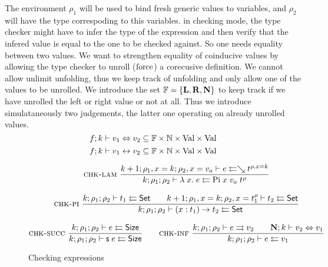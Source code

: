 The environment $\rho_1$ will be used to bind fresh generic values to variables, and $\rho_2$ will have the type correspoding to this variables. in checking mode, the type checker might have to infer the type of the expression and then verify that the infered value is equal to the one to be checked against.
So one needs equality between two values.
We want to strengthen equality of coinducive values by allowing the type checker to unroll ($\mathrm{force}$) a corecusive definition. We cannot allow unlimit unfolding, thus we keep track of unfolding and only allow one of the values to be unrolled.
We introduce the set $ \mathbb{F} = \{\mathbf{L}, \mathbf{R}, \mathbf{N} \} $ to keep track if we have unrolled the left or right value or not at all.
Thus we introduce simulataneously two judgements, the latter one operating on already unrolled values.
\[f;k\vdash v_1\Leftrightarrow v_2 \subseteq \mathbb{F} \times \mathbb{N} \times \mathrm{Val} \times \mathrm{Val} \]
\[f;k\vdash v_1{\;\leftrightarrow\;}v_2 \subseteq \mathbb{F} \times \mathbb{N} \times\mathrm{Val} \times \mathrm{Val} \]

\begin{figure}[p]

\begin{gather*}
\mbox{\sc chk-lam}\ \dfrac{k+1;\rho_1,x=k;\rho_2,x=v_a\vdash e\leftleftarrows\searrow t^{\rho,x=k}}{k;\rho_1;\rho_2\vdash\lambda\; x .\;{e}\leftleftarrows\mathrm{Pi} \; x \; v_a \; t^{\rho}}
\\[2ex]
\mbox{\sc chk-pi}\ \dfrac{k;\rho_1;\rho_2\vdash t_1\leftleftarrows\mathsf{Set}
\qquad
k+1;\rho_1,x=k;\rho_2,x=t_1^{\rho}\vdash t_2\leftleftarrows\mathsf{Set}
}{k;\rho_1;\rho_2\vdash( x : t_1 ) \rightarrow{t_2}\leftleftarrows\mathsf{Set}}
\\[2ex]
\mbox{\sc chk-succ}\ \dfrac{k;\rho_1;\rho_2\vdash e\leftleftarrows\mathsf{Size}}{k;\rho_1;\rho_2\vdash\mathsf{s}\; e\leftleftarrows\mathsf{Size}} 
\qquad
\mbox{\sc chk-inf}\ \dfrac{k;\rho_1;\rho_2\vdash e\rightrightarrows v_2
\qquad
\mathbf{N};k\vdash v_2\Leftrightarrow v_1}{k;\rho_1;\rho_2\vdash e\leftleftarrows v_1}
\end{gather*}
\caption{Checking expressions}
\end{figure}

